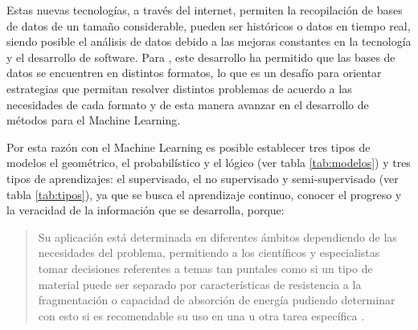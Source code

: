 Estas nuevas tecnologías, a través del internet, permiten la recopilación de bases de datos de un tamaño considerable, pueden ser históricos o datos en tiempo real, siendo posible el análisis de datos debido a las mejoras constantes en la tecnología y el desarrollo de software. Para \cite{salamanca2021}, este desarrollo ha permitido que las bases de datos se encuentren en distintos formatos, lo que es un desafío para orientar estrategias que permitan resolver distintos problemas de acuerdo a las necesidades de cada formato y de esta manera avanzar en el desarrollo de métodos para el Machine Learning.

Por esta razón con el Machine Learning es posible establecer tres tipos de modelos el geométrico, el probabilístico y el lógico (ver tabla \ref{tab:modelos}) y tres tipos de aprendizajes: el supervisado, el no supervisado y semi-supervisado (ver tabla \ref{tab:tipos}), ya que se busca el aprendizaje continuo, conocer el progreso y la veracidad de la información que se desarrolla, porque:

\begin{quote}
   Su aplicación está determinada en diferentes ámbitos dependiendo de las necesidades del problema, permitiendo a los científicos y especialistas tomar decisiones referentes a temas tan puntales como si un tipo de material puede ser separado por características de resistencia a la fragmentación o capacidad de absorción de energía pudiendo determinar con esto si es recomendable su uso en una u otra tarea específica \citep[p.42]{salamanca2021}.
\end{quote}

